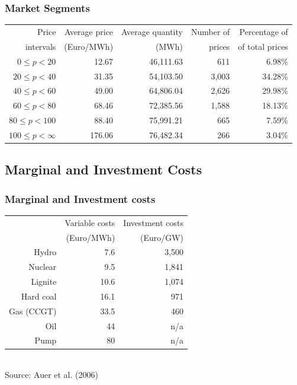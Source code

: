\begin{frame}
  \frametitle{Market Segments}

\begin{center}
\small
\begin{tabular}{rrrrr}
  \hline
Price & Average price  & Average quantity & Number of & Percentage of \\
intervals& (Euro/MWh) &  (MWh) &  prices & of total prices\\
  \hline\hline
$0\leq p<20$ & 12.67 & 46,111.63 & 611 & 6.98\% \\
$20\leq p<40$ & 31.35 & 54,103.50 & 3,003 & 34.28\% \\
$40\leq p<60$ & 49.00 & 64,806.04 & 2,626 & 29.98\% \\
$60\leq p<80$ & 68.46 & 72,385.56 & 1,588 & 18.13\% \\
$80\leq p<100$ & 88.40 & 75,991.21 & 665 & 7.59\% \\
$100\leq p<\infty$& 176.06 & 76,482.34 & 266 & 3.04\% \\
   \hline
\end{tabular}  
\normalsize
\end{center}

\end{frame}

\subsection{Marginal and Investment Costs}

\begin{frame}
  \frametitle{Marginal and Investment costs}
\begin{center}
  \begin{tabular}{rrr}
\hline
           & Variable costs & Investment costs\\
           &  (Euro/MWh)    &  (Euro/GW) \\
\hline\hline
     Hydro &        7.6 &    3,500\\

   Nuclear &        9.5 &    1,841 \\

   Lignite &       10.6 &    1,074 \\

 Hard coal &       16.1 &     971 \\

 Gas (CCGT) &       33.5 &     460 \\

Oil & 44            &   n/a\\

Pump &         80 &       n/a\\
\hline
\end{tabular}
\\
\vspace{0.3cm}
\scriptsize Source: Auer et al. (2006)
\end{center}
\end{frame}

